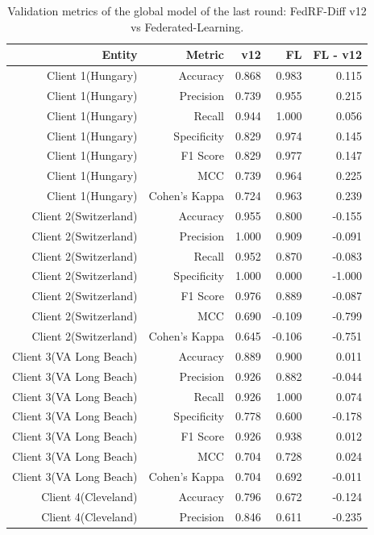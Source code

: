 \begin{table}[t]
\centering
\small
\caption{Validation metrics of the global model of the last round: FedRF-Diff v12 vs Federated-Learning.}
\label{tab:v12_fl_metrics_last_round}
\begin{tabular}{rrrrr}
\toprule
Entity & Metric & v12 & FL & FL - v12 \\
\midrule
Client 1(Hungary) & Accuracy & 0.868 & 0.983 & 0.115 \\
Client 1(Hungary) & Precision & 0.739 & 0.955 & 0.215 \\
Client 1(Hungary) & Recall & 0.944 & 1.000 & 0.056 \\
Client 1(Hungary) & Specificity & 0.829 & 0.974 & 0.145 \\
Client 1(Hungary) & F1 Score & 0.829 & 0.977 & 0.147 \\
Client 1(Hungary) & MCC & 0.739 & 0.964 & 0.225 \\
Client 1(Hungary) & Cohen's Kappa & 0.724 & 0.963 & 0.239 \\
Client 2(Switzerland) & Accuracy & 0.955 & 0.800 & -0.155 \\
Client 2(Switzerland) & Precision & 1.000 & 0.909 & -0.091 \\
Client 2(Switzerland) & Recall & 0.952 & 0.870 & -0.083 \\
Client 2(Switzerland) & Specificity & 1.000 & 0.000 & -1.000 \\
Client 2(Switzerland) & F1 Score & 0.976 & 0.889 & -0.087 \\
Client 2(Switzerland) & MCC & 0.690 & -0.109 & -0.799 \\
Client 2(Switzerland) & Cohen's Kappa & 0.645 & -0.106 & -0.751 \\
Client 3(VA Long Beach) & Accuracy & 0.889 & 0.900 & 0.011 \\
Client 3(VA Long Beach) & Precision & 0.926 & 0.882 & -0.044 \\
Client 3(VA Long Beach) & Recall & 0.926 & 1.000 & 0.074 \\
Client 3(VA Long Beach) & Specificity & 0.778 & 0.600 & -0.178 \\
Client 3(VA Long Beach) & F1 Score & 0.926 & 0.938 & 0.012 \\
Client 3(VA Long Beach) & MCC & 0.704 & 0.728 & 0.024 \\
Client 3(VA Long Beach) & Cohen's Kappa & 0.704 & 0.692 & -0.011 \\
Client 4(Cleveland) & Accuracy & 0.796 & 0.672 & -0.124 \\
Client 4(Cleveland) & Precision & 0.846 & 0.611 & -0.235 \\

\end{tabular}
\end{table}
